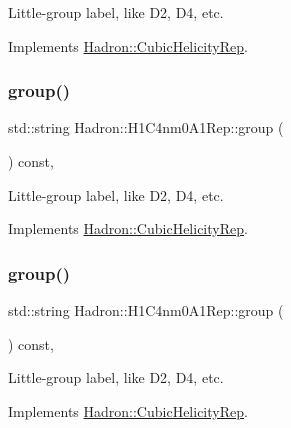 Little-\/group label, like D2, D4, etc. 

Implements \mbox{\hyperlink{structHadron_1_1CubicHelicityRep_a101a7d76cd8ccdad0f272db44b766113}{Hadron\+::\+Cubic\+Helicity\+Rep}}.

\mbox{\label{structHadron_1_1H1C4nm0A1Rep_a5f7db1ef15b67eaee1c5fc81ed9ec2bd}} 
\subsubsection{\texorpdfstring{group()}{group()}\hspace{0.1cm}{\footnotesize\ttfamily [2/3]}}
{\footnotesize\ttfamily std\+::string Hadron\+::\+H1\+C4nm0\+A1\+Rep\+::group (\begin{DoxyParamCaption}{ }\end{DoxyParamCaption}) const\hspace{0.3cm}{\ttfamily [inline]}, {\ttfamily [virtual]}}

Little-\/group label, like D2, D4, etc. 

Implements \mbox{\hyperlink{structHadron_1_1CubicHelicityRep_a101a7d76cd8ccdad0f272db44b766113}{Hadron\+::\+Cubic\+Helicity\+Rep}}.

\mbox{\label{structHadron_1_1H1C4nm0A1Rep_a5f7db1ef15b67eaee1c5fc81ed9ec2bd}} 
\subsubsection{\texorpdfstring{group()}{group()}\hspace{0.1cm}{\footnotesize\ttfamily [3/3]}}
{\footnotesize\ttfamily std\+::string Hadron\+::\+H1\+C4nm0\+A1\+Rep\+::group (\begin{DoxyParamCaption}{ }\end{DoxyParamCaption}) const\hspace{0.3cm}{\ttfamily [inline]}, {\ttfamily [virtual]}}

Little-\/group label, like D2, D4, etc. 

Implements \mbox{\hyperlink{structHadron_1_1CubicHelicityRep_a101a7d76cd8ccdad0f272db44b766113}{Hadron\+::\+Cubic\+Helicity\+Rep}}.


